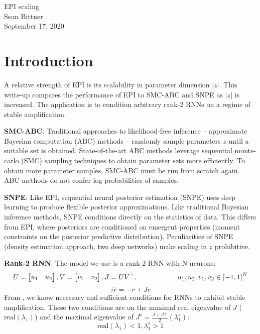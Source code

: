 \documentclass[11pt]{article}
\begin{document}
\medskip                        %


\thispagestyle{plain}
\begin{center}                  %
{\Large EPI scaling} \\
Sean Bittner \\
September 17, 2020 \\
\end{center}

\section{Introduction}
A relative strength of EPI is its scalability in parameter dimension $|z|$. 
This write-up compares the performance of EPI to SMC-ABC and SNPE as $|z|$ is increased.  
The application is to condition arbitrary rank-2 RNNs on a regime of stable amplification.

\textbf{SMC-ABC}: 
Traditional approaches to likelihood-free inference -- approximate Bayesian computation (ABC) methods -- randomly sample parameters $z$ until a suitable set is obtained.
State-of-the-art ABC methods leverage sequential monte-carlo (SMC) sampling techniques to obtain parameter sets more efficiently.
To obtain more parameter samples, SMC-ABC must be run from scratch again.
ABC methods do not confer log probabilities of samples.

\textbf{SNPE}: Like EPI, sequential neural posterior estimation (SNPE) uses deep learning to produce flexible posterior approximations.
Like traditional Bayesian inference methods, SNPE conditions directly on the statistics of data.
This differs from EPI, where posteriors are conditioned on emergent properties (moment constraints on the posterior predictive distribution).
Peculiarities of SNPE (density estimation approach, two deep networks) make scaling in $z$ prohibitive.

\textbf{Rank-2 RNN}: The model we use is a rank-2 RNN with N neurons:
\begin{equation*}
U = \begin{bmatrix} u_1 & u_2 \end{bmatrix}, V = \begin{bmatrix} v_1 & v_2 \end{bmatrix}, J = UV^\top, \text{\hspace{2cm}}
u_1, u_2, v_1, v_2 \in \left[-1, 1 \right]^N
\end{equation*}
\begin{equation*}
\tau \dot{r} = -r + Jr
\end{equation*}
From \cite{bondanelli2020coding}, we know necessary and sufficient conditions for RNNs to exhibit stable amplification.  These two conditions are on the maximal real eigenvalue of $J$ ($\text{real}(\lambda_1)$) and the maximal eigenvalue of $J^s = \frac{J + J\top}{2} (\lambda^s_1)$:
\[\text{real}(\lambda_1) < 1, \lambda^s_1 > 1\]
\end{document}
